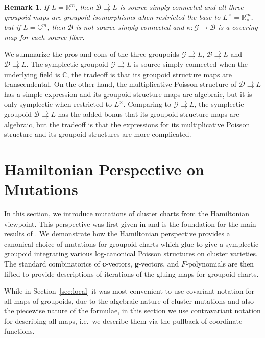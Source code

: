 \documentclass{amsart}
\newtheorem{remark}[theorem]{Remark}
\numberwithin{equation}{section}
\newcommand{\bfc}{\mathbf{c}}
\newcommand{\bfg}{\mathbf{g}}
\newcommand{\cB}{\mathcal{B}}
\newcommand{\cD}{\mathcal{D}}
\newcommand{\cG}{\mathcal{G}}
\newcommand{\CC}{\mathbb{C}}
\newcommand{\RR}{\mathbb{R}}
\newcommand{\rra}{\rightrightarrows}
\begin{document}
\begin{remark}
  If $L = \RR^m$, then $\cB \rra L$ is source-simply-connected and all three groupoid maps are groupoid isomorphisms when restricted the base to $L^\times = \RR_\times^m$, but if $L = \CC^m$, then $\cB$ is not source-simply-connected and $\kappa: \cG \to \cB$ is a covering map for each source fiber.
\end{remark}

We summarize the pros and cons of the three groupoids $\cG \rra L$, $\cB \rra L$ and $\cD \rra L$.
The symplectic groupoid $\cG \rra L$ is source-simply-connected when the underlying field is $\CC$, the tradeoff is that its groupoid structure maps are transcendental.
On the other hand, the multiplicative Poisson structure of $\cD \rra L$ has a simple expression and its groupoid structure maps are algebraic, but it is only symplectic when restricted to $L^\times$.
Comparing to $\cG \rra L$, the symplectic groupoid $\cB \rra L$ has the added bonus that its groupoid structure maps are algebraic, but the tradeoff is that the expressions for its multiplicative Poisson structure and its groupoid structures are more complicated.


\section{Hamiltonian Perspective on Mutations}
\label{sec:mutations}

In this section, we introduce mutations of cluster charts from the Hamiltonian viewpoint.
This perspective was first given in \cite{FG09c} and is the foundation for the main results of \cite{GNR17}.
We demonstrate how the Hamiltonian perspective provides a canonical choice of mutations for groupoid charts which glue to give a symplectic groupoid integrating various log-canonical Poisson structures on cluster varieties.
The standard combinatorics of $\bfc$-vectors, $\bfg$-vectors, and $F$-polynomials are then lifted to provide descriptions of iterations of the gluing maps for groupoid charts.

While in Section~\ref{sec:local} it was most convenient to use covariant notation for all maps of groupoids, due to the algebraic nature of cluster mutations and also the piecewise nature of the formulae, in this section we use contravariant notation for describing all maps, i.e.\ we describe them via the pullback of coordinate functions.
\end{document}
